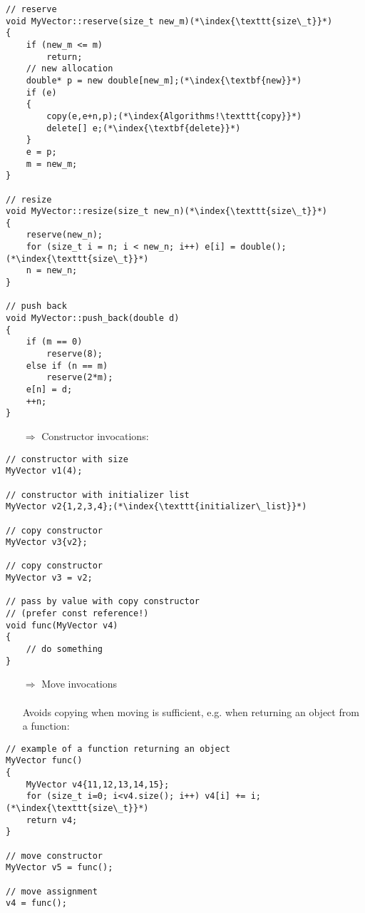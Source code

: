 \documentclass[10pt]{book}
\begin{document}
\begin{lstlisting}
// reserve
void MyVector::reserve(size_t new_m)(*\index{\texttt{size\_t}}*)
{
    if (new_m <= m)
        return;
    // new allocation
    double* p = new double[new_m];(*\index{\textbf{new}}*)
    if (e)
    {
        copy(e,e+n,p);(*\index{Algorithms!\texttt{copy}}*)
        delete[] e;(*\index{\textbf{delete}}*)
    }
    e = p;
    m = new_m;
}

// resize
void MyVector::resize(size_t new_n)(*\index{\texttt{size\_t}}*)
{
    reserve(new_n);
    for (size_t i = n; i < new_n; i++) e[i] = double();(*\index{\texttt{size\_t}}*)
    n = new_n;
}

// push back
void MyVector::push_back(double d)
{
    if (m == 0)
        reserve(8);
    else if (n == m)
        reserve(2*m);
    e[n] = d;
    ++n;
}
\end{lstlisting}
\begin{enumerate}
\item[$\Rightarrow$] Constructor invocations:
\end{enumerate}
\begin{lstlisting}
// constructor with size
MyVector v1(4); 

// constructor with initializer list
MyVector v2{1,2,3,4};(*\index{\texttt{initializer\_list}}*)

// copy constructor
MyVector v3{v2}; 

// copy constructor
MyVector v3 = v2; 

// pass by value with copy constructor
// (prefer const reference!)
void func(MyVector v4)
{
    // do something
}
\end{lstlisting}
\begin{enumerate}
\item[$\Rightarrow$] Move invocations\\ \\ Avoids copying when moving is sufficient, e.g. when returning an object from a function:
\end{enumerate}
\begin{lstlisting}
// example of a function returning an object
MyVector func()
{
    MyVector v4{11,12,13,14,15};
    for (size_t i=0; i<v4.size(); i++) v4[i] += i;(*\index{\texttt{size\_t}}*)
    return v4;
}

// move constructor
MyVector v5 = func(); 

// move assignment
v4 = func();       
\end{lstlisting}
\end{document}
